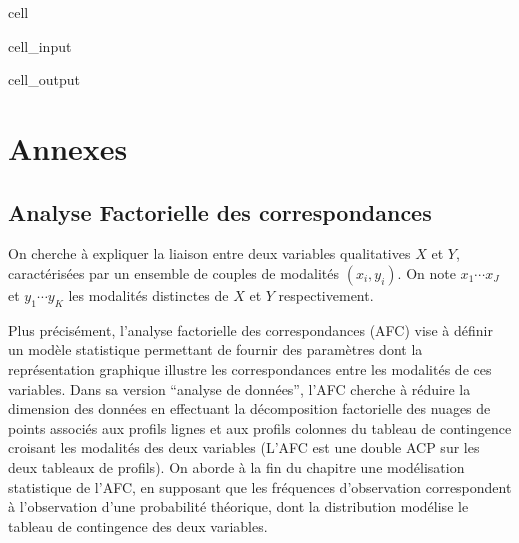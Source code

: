 \documentclass[letterpaper,10pt,english]{jupyterBook}
\begin{document}
\begin{sphinxuseclass}{cell}
\begin{sphinxVerbatimInput}
\begin{sphinxuseclass}{cell_input}
\end{sphinxuseclass}\end{sphinxVerbatimInput}
\begin{sphinxVerbatimOutput}

\begin{sphinxuseclass}{cell_output}
\noindent{}

\end{sphinxuseclass}\end{sphinxVerbatimOutput}

\end{sphinxuseclass}
\sphinxstepscope


\part{Annexes}

\sphinxstepscope


\chapter{Analyse Factorielle des correspondances}
\label{\detokenize{afc:analyse-factorielle-des-correspondances}}\label{\detokenize{afc::doc}}
\ignorespaces 
\sphinxAtStartPar
On cherche à expliquer la liaison entre deux variables qualitatives \(X\) et \(Y\), caractérisées par un ensemble de couples de modalités \((x_i,y_i)\). On note \(x_1\cdots x_J\) et \(y_1\cdots y_K\) les modalités distinctes de \(X\) et \(Y\) respectivement.

\sphinxAtStartPar
Plus précisément, l’analyse factorielle des correspondances (AFC) vise à définir un modèle statistique permettant de fournir des paramètres dont la représentation graphique illustre les correspondances entre les modalités de ces variables. Dans sa version “analyse de données”, l’AFC cherche à réduire la dimension des données en effectuant la décomposition factorielle des nuages de points associés aux profils lignes et aux profils colonnes du tableau de contingence croisant les modalités des deux variables (L’AFC est une double ACP sur les deux tableaux de profils). On aborde à la fin du chapitre une modélisation statistique de l’AFC, en supposant que les fréquences d’observation correspondent à l’observation d’une probabilité théorique, dont la distribution modélise le tableau de contingence des deux variables.
\end{document}
